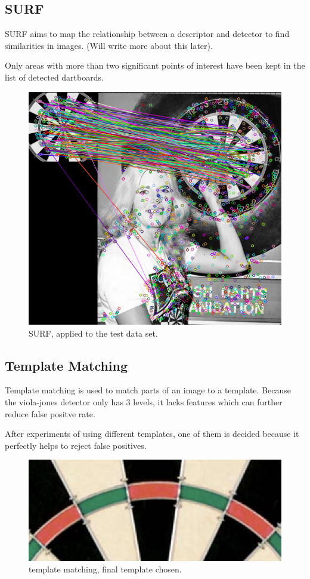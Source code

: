\documentclass[conference]{IEEEtran}
\begin{document}
\subsection{SURF}
SURF aims to map the relationship between a descriptor and detector to find similarities in images. (Will write more about this later). \par

Only areas with more than two significant points of interest have been kept in the list of detected dartboards.
\par 
\begin{figure}[htbp]
\begin{center}
\includegraphics[width=0.8\linewidth]{images/SURF.png}
\caption{SURF, applied to the test data set. }
\label{default}
\end{center}
\end{figure}



\subsection{Template Matching}
Template matching is used to  match parts of an image to a template. Because the viola-jones detector only has 3 levels, it lacks features which can further reduce false positve rate. \par

After experiments of using different templates, one of them is decided because it perfectly helps to reject false positives.
\par 
\begin{figure}[htbp]
\begin{center}
\includegraphics[width=0.8\linewidth]{images/template.png}
\caption{template matching, final template chosen. }
\label{default}
\end{center}
\end{figure}
\end{document}
